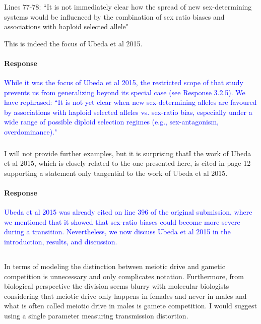 \documentclass[10pt,letterpaper]{article}
\begin{document}
\noindent\subsubsection{}
Lines 77-78: ``It is not immediately clear how the spread of new sex-determining systems would be influenced by the combination of sex ratio biases and associations with haploid selected allele"

This is indeed the focus of Ubeda et al 2015.

\noindent\paragraph{Response}
\textcolor{blue}{While it was the focus of Ubeda et al 2015, the restricted scope of that study prevents us from generalizing beyond its special case (see Response 3.2.5).
We have rephrased: ``It is not yet clear when new sex-determining alleles are favoured by associations with haploid selected alleles vs. sex-ratio bias, especially under a wide range of possible diploid selection regimes (e.g., sex-antagonism, overdominance)."
}

\noindent\subsubsection{}
I will not provide further examples, but it is surprising thatI the work of Ubeda et al 2015, which is closely related to the one presented here, is cited in page 12 supporting a statement only tangential to the work of Ubeda et al 2015.

\noindent\paragraph{Response}
\textcolor{blue}{Ubeda et al 2015 was already cited on line 396 of the original submission, where we mentioned that it showed that sex-ratio biases could become more severe during a transition.
Nevertheless, we now discuss Ubeda et al 2015 in the introduction, results, and discussion.}

\noindent\subsection{}
In terms of modeling the distinction between meiotic drive and gametic competition is unnecessary and only complicates notation. Furthermore, from biological perspective the division seems blurry with molecular biologists considering that meiotic drive only happens in females and never in males and what is often called meiotic drive in males is gamete competition. I would suggest using a single parameter measuring transmission distortion.
\end{document}
